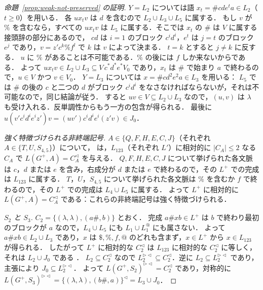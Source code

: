 \documentclass[11pt,a4paper]{ltjsarticle}
\numberwithin{equation}{section}
\theoremstyle{plain}
\theoremstyle{definition}
\theoremstyle{remark}
\theoremstyle{plain}
\newcommand{\eps}{\lambda}
\newcommand{\Lc}{^{\lhd}}
\newcommand{\RL}{^{\rhd\lhd}}
\begin{document}
\begin{proof}[命題~\ref{prop:weak-not-preserved} の証明]
$Y=L_2$ については語 $x_t=\#cde^ta\in L_2$（$t\ge0$）を用いる．
各 $ux_tv$ は $d$ を含むので $L_2\cup L_3\cup L_5$ に属する．
もし $v$ が $\%$ を含むなら，すべての $ux_tv$ は $L_5$ に属する．そこでは $x_t$ の $\#$ は $V$ に属する接頭辞の部分にあるので，
$cd$ は $i=1$ のブロック $c^id^i$，$e^t$ は $j=t$ のブロック $e^j$ であり，$v=z'c^k\%f^l$ で $k$ は $v$ によって決まる．
$t=k$ とすると $j\ne k$ に反する．
$u$ に $\%$ があることは不可能である．$\%$ の後には $f$ しか来ないからである．
よって $ux_tv\in L_2\cup L_3\subseteq V\,c^*d^*e^*V_0$ であり，$x_t$ は $\#$ で始まり $a$ で終わるので，$u\in V$ かつ $v\in V_0$．
$Y=L_3$ については $x=\#cd^2e^2a\in L_3$ を用いる：
$L_5$ では $\#$ の後の $c$ と二つの $d$ がブロック $c^id^i$ をなさなければならないが，それは不可能なので，同じ結論が従う．
すると $uv\in V\subseteq L_2\cup L_3$ なので，$(u,v)$ は $\eps$ も受け入れる．反単調性からもう一方の包含が得られる．
最後に $u(v'c^id^ie^iz')v=(uv')c^id^ie^i(z'v)\in J_0$．

\emph{強く特徴づけられる非終端記号.}  $A\in\{Q,F,H,E,C,J\}$（それぞれ $A\in\{T,U,S_{4,5}\}$）について，
\citet[proofs of Lemmas~8 and~12]{ky2017} は，$L_{123}$（それぞれ $L'$）に相対的に $|C_A|\le2$ なる $C_A$ で $L(G^+,A)=C_A\Lc$ を与える．
$Q,F,H,E,C,J$ について挙げられた各文脈は $c$，$d$ または $e$ を含み，右成分が $d$ または $e$ で終わるので，その $L^+$ での完成は $L_{123}$ に属する．
$T$，$U$，$S_{4,5}$ について挙げられた各文脈は $\%$ を含むか $f$ で終わるので，その $L^+$ での完成は $L_4\cup L_5$ に属する．
よって $L^+$ に相対的に $L(G^+,A)=C_A\Lc$ である：これらの非終端記号は強く特徴づけられる．

\emph{$S_2$ と $S_3$.}  $C_2=\{(\eps,\eps),(a\#,b)\}$ とおく．
完成 $a\#xb\in L^+$ は $b$ で終わり最初のブロックが $a$ なので，$L_4\cup L_5$ にも $L_1\cup L_1^@$ にも属さない．
よって $a\#xb\in L_2\cup L_3$ であり，$x$ は $\$,\%,f,@$ のどれも含まず，$x\in L^+$ から $x\in L_{123}$ が得られる．
したがって $L^+$ に相対的な $C_2\Lc$ は $L_{123}$ に相対的な $C_2\Lc$ に等しく，それは $L_2\cup J_0$ である \citep[proof of Lemma~8]{ky2017}．
$L_2\subseteq C_2\Lc$ なので $L_2\RL\subseteq C_2\Lc$．逆に $L_2\subseteq L_2\RL$ であり，主張により $J_0\subseteq L_2\RL$．
よって $L(G^+,S_2)\RL=C_2\Lc$ であり，対称的に $L(G^+,S_3)\RL=\{(\eps,\eps),(b\#,a)\}\Lc=L_3\cup J_0$．


\end{proof}
\end{document}

